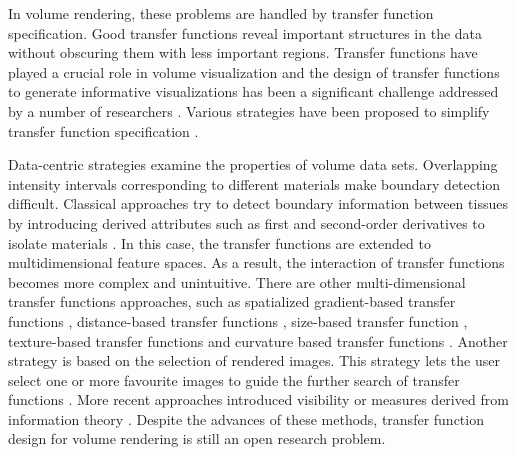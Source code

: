 In volume rendering, these problems are handled by transfer function specification.
Good transfer functions reveal important structures in the data without obscuring them with less important regions.
Transfer functions have played a crucial role in volume visualization and the design of transfer functions to generate informative visualizations has been a significant challenge addressed by a number of researchers \cite{pfister_transfer_2001}.
Various strategies have been proposed to simplify transfer function specification \cite{hadwiger_real-time_2006}.

Data-centric strategies examine the properties of volume data sets. Overlapping intensity intervals corresponding to different materials make boundary detection difficult. Classical approaches try to detect boundary information between tissues by introducing derived attributes such as first and second-order derivatives to isolate materials \cite{kindlmann_semi-automatic_1998} \cite{kniss_multidimensional_2002}. In this case, the transfer functions are extended to multidimensional feature spaces. As a result, the interaction of transfer functions becomes more complex and unintuitive.
There are other multi-dimensional transfer functions approaches, such as spatialized gradient-based transfer functions \cite{roettger_spatialized_2005}, distance-based transfer functions \cite{tappenbeck_distance-based_2006}, size-based transfer function \cite{correa_size-based_2008}, texture-based transfer functions \cite{caban_texture-based_2008} and curvature based transfer functions \cite{kindlmann_curvature-based_2003}.
Another strategy is based on the selection of rendered images. This strategy lets the user select one or more favourite images to guide the further search of transfer functions \cite{marks_design_1997} \cite{wu_interactive_2007}. More recent approaches introduced visibility \cite{correa_visibility_2011} or measures derived from information theory \cite{haidacher_information-based_2008} \cite{bruckner_isosurface_2010} \cite{ruiz_automatic_2011} \cite{bramon_information_2013}. Despite the advances of these methods, transfer function design for volume rendering is still an open research problem.

